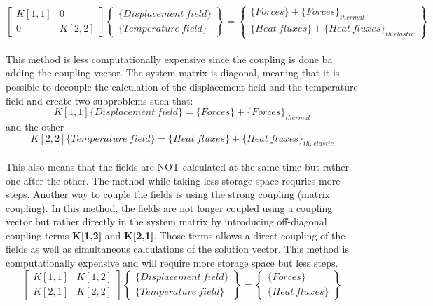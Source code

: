 \begin{equation}
    \begin{bmatrix} K[1,1] & 0 \\ 0 & K[2,2] \end{bmatrix}
    \begin{Bmatrix} \{Displacement \ field\} \\ \{Temperature \ field\} \end{Bmatrix}
    =
    \begin{Bmatrix} \{Forces\}+\{Forces\}_{thermal} \\ \{Heat \ fluxes\}+\{Heat \ fluxes\}_{th. elastic} \end{Bmatrix}
    \label{eq:coupling}
\end{equation}
\\
\normalsize{\indent This method is less computationally expensive since the coupling is done ba adding the coupling vector. The system matrix is diagonal, meaning that it is possible to decouple the calculation of the displacement field and the temperature field and create two subproblems such that:}
\\
\begin{equation}
    K[1,1] \{Displacement \ field\} = \{Forces\}+\{Forces\}_{thermal}
\end{equation}
\normalsize{and the other}
\begin{equation}
    K[2,2] \{Temperature \ field\} = \{Heat \ fluxes\}+\{Heat \ fluxes\}_{th. \ elastic}
\end{equation}
\\
\normalsize{\indent This also means that the fields are NOT calculated at the same time but rather one after the other. The method while taking less storage space requries more steps. Another way to couple the fields is using the strong coupling (matrix coupling). In this method, the fields are not longer coupled using a coupling vector but rather directly in the system matrix by introducing off-diagonal coupling terms {\bfseries K[1,2]} and {\bfseries K[2,1]}. Those terms allows a direct coupling of the fields as well as simultaneous calculations of the solution vector. This method is computationally expensive and will require more storage space but less steps.}
\\
\begin{equation}
    \begin{bmatrix} K[1,1] & K[1,2] \\ K[2,1] & K[2,2] \end{bmatrix}
    \begin{Bmatrix} \{Displacement \ field\} \\ \{Temperature \ field\} \end{Bmatrix}
    =
    \begin{Bmatrix} \{Forces\} \\ \{Heat \ fluxes\} \end{Bmatrix}
    \label{eq:coupling3}
\end{equation}
